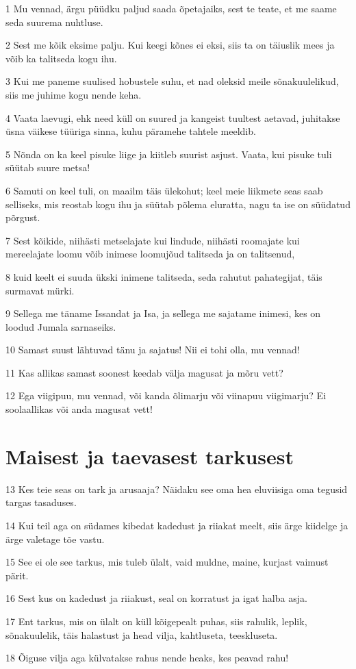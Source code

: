 \par 1 Mu vennad, ärgu püüdku paljud saada õpetajaiks, sest te teate, et me saame seda suurema nuhtluse.
\par 2 Sest me kõik eksime palju. Kui keegi kõnes ei eksi, siis ta on täiuslik mees ja võib ka talitseda kogu ihu.
\par 3 Kui me paneme suulised hobustele suhu, et nad oleksid meile sõnakuulelikud, siis me juhime kogu nende keha.
\par 4 Vaata laevugi, ehk need küll on suured ja kangeist tuultest aetavad, juhitakse üsna väikese tüüriga sinna, kuhu päramehe tahtele meeldib.
\par 5 Nõnda on ka keel pisuke liige ja kiitleb suurist asjust. Vaata, kui pisuke tuli süütab suure metsa!
\par 6 Samuti on keel tuli, on maailm täis ülekohut; keel meie liikmete seas saab selliseks, mis reostab kogu ihu ja süütab põlema eluratta, nagu ta ise on süüdatud põrgust.
\par 7 Sest kõikide, niihästi metselajate kui lindude, niihästi roomajate kui mereelajate loomu võib inimese loomujõud talitseda ja on talitsenud,
\par 8 kuid keelt ei suuda ükski inimene talitseda, seda rahutut pahategijat, täis surmavat mürki.
\par 9 Sellega me täname Issandat ja Isa, ja sellega me sajatame inimesi, kes on loodud Jumala sarnaseiks.
\par 10 Samast suust lähtuvad tänu ja sajatus! Nii ei tohi olla, mu vennad!
\par 11 Kas allikas samast soonest keedab välja magusat ja mõru vett?
\par 12 Ega viigipuu, mu vennad, või kanda õlimarju või viinapuu viigimarju? Ei soolaallikas või anda magusat vett!

\section*{Maisest ja taevasest tarkusest}

\par 13 Kes teie seas on tark ja arusaaja? Näidaku see oma hea eluviisiga oma tegusid targas tasaduses.
\par 14 Kui teil aga on südames kibedat kadedust ja riiakat meelt, siis ärge kiidelge ja ärge valetage tõe vastu.
\par 15 See ei ole see tarkus, mis tuleb ülalt, vaid muldne, maine, kurjast vaimust pärit.
\par 16 Sest kus on kadedust ja riiakust, seal on korratust ja igat halba asja.
\par 17 Ent tarkus, mis on ülalt on küll kõigepealt puhas, siis rahulik, leplik, sõnakuulelik, täis halastust ja head vilja, kahtluseta, teeskluseta.
\par 18 Õiguse vilja aga külvatakse rahus nende heaks, kes peavad rahu!


